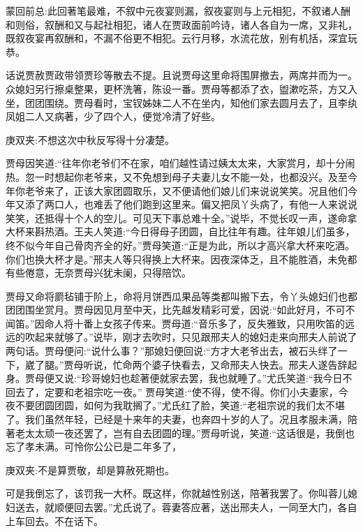 
\begin{parag}
    \begin{note}蒙回前总:此回著笔最难，不叙中元夜宴则漏，叙夜宴则与上元相犯，不叙诸人酬和则俗，叙酬和又与起社相犯，诸人在贾政面前吟诗，诸人各自为一席，又非礼，既叙夜宴再叙酬和，不漏不俗更不相犯。云行月移，水流花放，别有机括，深宜玩恭。\end{note}
\end{parag}


\begin{parag}
    话说贾赦贾政带领贾珍等散去不提。且说贾母这里命将围屏撤去，两席并而为一。众媳妇另行擦桌整果，更杯洗箸，陈设一番。贾母等都添了衣，盥漱吃茶，方又入坐，团团围绕。贾母看时，宝钗姊妹二人不在坐内，知他们家去圆月去了，且李纨凤姐二人又病著，少了四个人，便觉冷清了好些。\begin{note}庚双夹:不想这次中秋反写得十分凄楚。\end{note}贾母因笑道:“往年你老爷们不在家，咱们越性请过姨太太来，大家赏月，却十分闹热。忽一时想起你老爷来，又不免想到母子夫妻儿女不能一处，也都没兴。及至今年你老爷来了，正该大家团圆取乐，又不便请他们娘儿们来说说笑笑。况且他们今年又添了两口人，也难丢了他们跑到这里来。偏又把凤丫头病了，有他一人来说说笑笑，还抵得十个人的空儿。可见天下事总难十全。”说毕，不觉长叹一声，遂命拿大杯来斟热酒。王夫人笑道:“今日得母子团圆，自比往年有趣。往年娘儿们虽多，终不似今年自己骨肉齐全的好。”贾母笑道:“正是为此，所以才高兴拿大杯来吃酒。你们也换大杯才是。”邢夫人等只得换上大杯来。因夜深体乏，且不能胜酒，未免都有些倦意，无奈贾母兴犹未阑，只得陪饮。
\end{parag}


\begin{parag}
    贾母又命将罽毡铺于阶上，命将月饼西瓜果品等类都叫搬下去，令丫头媳妇们也都团团围坐赏月。贾母因见月至中天，比先越发精彩可爱，因说:“如此好月，不可不闻笛。”因命人将十番上女孩子传来。贾母道:“音乐多了，反失雅致，只用吹笛的远远的吹起来就够了。”说毕，刚才去吹时，只见跟邢夫人的媳妇走来向邢夫人前说了两句话。贾母便问:“说什么事？”那媳妇便回说:“方才大老爷出去，被石头绊了一下，崴了腿。”贾母听说，忙命两个婆子快看去，又命邢夫人快去。邢夫人遂告辞起身。贾母便又说:“珍哥媳妇也趁著便就家去罢，我也就睡了。”尤氏笑道:“我今日不回去了，定要和老祖宗吃一夜。” 贾母笑道:“使不得，使不得。你们小夫妻家，今夜不要团圆团圆，如何为我耽搁了。”尤氏红了脸，笑道:“老祖宗说的我们太不堪了。我们虽然年轻，已经是十来年的夫妻，也奔四十岁的人了。况且孝服未满，陪著老太太顽一夜还罢了，岂有自去团圆的理。”贾母听说，笑道:“这话很是，我倒也忘了孝未满。可怜你公公已是二年多了，\begin{note}庚双夹:不是算贾敬，却是算赦死期也。\end{note}可是我倒忘了，该罚我一大杯。既这样，你就越性别送，陪著我罢了。你叫蓉儿媳妇送去，就顺便回去罢。”尤氏说了。蓉妻答应著，送出邢夫人，一同至大门，各自上车回去。不在话下。
\end{parag}


